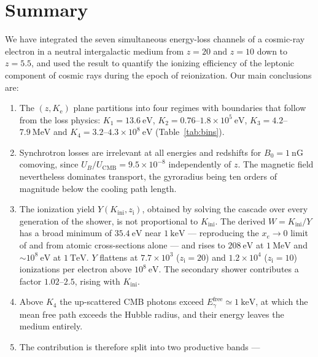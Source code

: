 \documentclass[twocolumn]{article}
\newcommand{\Ke}{K_{\mathrm{e}}}
\newcommand{\Kini}{K_{\mathrm{ini}}}
\newcommand{\zi}{z_{\mathrm{i}}}
\begin{document}
\section{Summary}

We have integrated the seven simultaneous energy-loss channels of a cosmic-ray
electron in a neutral intergalactic medium from $z = 20$ and $z = 10$ down to
$z = 5.5$, and used the result to quantify the ionizing efficiency of the
leptonic component of cosmic rays during the epoch of reionization. Our main
conclusions are:

\begin{enumerate}
\item The $(z,\Ke)$ plane partitions into four regimes with boundaries that
      follow from the loss physics: $K_1 = 13.6\ \mathrm{eV}$,
      $K_2 = 0.76$--$1.8\times10^{5}\ \mathrm{eV}$,
      $K_3 = 4.2$--$7.9\ \mathrm{MeV}$ and
      $K_4 = 3.2$--$4.3\times10^{8}\ \mathrm{eV}$ (Table~\ref{tab:bins}).
\item Synchrotron losses are irrelevant at all energies and redshifts for
      $B_0 = 1\ \mathrm{nG}$ comoving, since
      $U_B/U_{\mathrm{CMB}} = 9.5\times10^{-8}$ independently of $z$. The
      magnetic field nevertheless dominates transport, the gyroradius being
      ten orders of magnitude below the cooling path length.
\item The ionization yield $Y(\Kini,\zi)$, obtained by solving the cascade
      over every generation of the shower, is not proportional to $\Kini$.
      The derived $W = \Kini/Y$ has a broad minimum of $35.4\ \mathrm{eV}$
      near $1\ \mathrm{keV}$ --- reproducing the $x_e \rightarrow 0$ limit of
      \citet{Shull1985} and \citet{Furlanetto2010} from atomic cross-sections
      alone --- and rises to $208\ \mathrm{eV}$ at $1\ \mathrm{MeV}$ and
      $\sim\!10^{8}\ \mathrm{eV}$ at $1\ \mathrm{TeV}$. $Y$ flattens at
      $7.7\times10^{3}$ ($\zi = 20$) and $1.2\times10^{4}$ ($\zi = 10$)
      ionizations per electron above $10^{8}\ \mathrm{eV}$. The secondary
      shower contributes a factor $1.02$--$2.5$, rising with $\Kini$.
\item Above $K_4$ the up-scattered CMB photons exceed
      $E_\gamma^{\mathrm{free}} \simeq 1\ \mathrm{keV}$, at which the mean free
      path exceeds the Hubble radius, and their energy leaves the medium
      entirely.
\item The contribution is therefore split into two productive bands ---

\end{enumerate}
\end{document}
